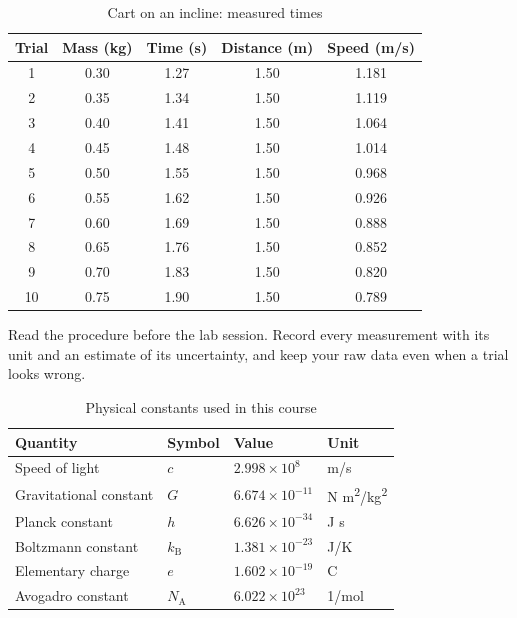 \documentclass[11pt]{article}
\begin{document}
\begin{table}[H]\centering
\caption{Cart on an incline: measured times}

\begin{tabular}{c S[table-format=1.2] S[table-format=1.2] S[table-format=1.2] S[table-format=1.3]}
\toprule
{\textbf{Trial}} & {\textbf{Mass (kg)}} & {\textbf{Time (s)}} & {\textbf{Distance (m)}} & {\textbf{Speed (m/s)}} \\
 & 0.30 & 1.27 & 1.50 & 1.181 \\
2 & 0.35 & 1.34 & 1.50 & 1.119 \\
3 & 0.40 & 1.41 & 1.50 & 1.064 \\
4 & 0.45 & 1.48 & 1.50 & 1.014 \\
5 & 0.50 & 1.55 & 1.50 & 0.968 \\
6 & 0.55 & 1.62 & 1.50 & 0.926 \\
7 & 0.60 & 1.69 & 1.50 & 0.888 \\
8 & 0.65 & 1.76 & 1.50 & 0.852 \\
9 & 0.70 & 1.83 & 1.50 & 0.820 \\
10 & 0.75 & 1.90 & 1.50 & 0.789 \\
\bottomrule
\end{tabular}
\end{table}

Read the procedure before the lab session. Record every measurement with its unit and an estimate of its uncertainty, and keep your raw data even when a trial looks wrong. 
\begin{table}[H]\centering
\caption{Physical constants used in this course}
\begin{tabular}{llll}
\toprule
\textbf{Quantity} & \textbf{Symbol} & \textbf{Value} & \textbf{Unit} \\
\midrule
Speed of light & $c$ & $2.998 \times 10^{8}$ & m/s \\
Gravitational constant & $G$ & $6.674 \times 10^{-11}$ & N m\textsuperscript{2}/kg\textsuperscript{2} \\
Planck constant & $h$ & $6.626 \times 10^{-34}$ & J s \\
Boltzmann constant & $k_\mathrm{B}$ & $1.381 \times 10^{-23}$ & J/K \\
Elementary charge & $e$ & $1.602 \times 10^{-19}$ & C \\
Avogadro constant & $N_\mathrm{A}$ & $6.022 \times 10^{23}$ & 1/mol \\
\bottomrule
\end{tabular}
\end{table}
\end{document}

